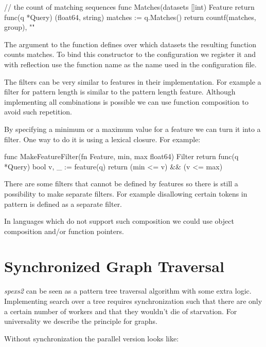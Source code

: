 \begin{file}
// the count of matching sequences
func Matches(datasets []int) Feature {
    return func(q *Query) (float64, string) {
        matches := q.Matches()
        return countf(matches, group), ""
    }
}    
\end{file}

The argument to the function defines over which datasets the resulting function counts matches. To bind this constructor to the configuration we register it and with reflection use the function name as the name used in the configuration file.

The filters can be very similar to features in their implementation. For example a filter for pattern length is similar to the pattern length feature. Although implementing all combinations is possible we can use function composition to avoid such repetition.

By specifying a minimum or a maximum value for a feature we can turn it into a filter. One way to do it is using a lexical closure. For example:

\begin{file}
func MakeFeatureFilter(fn Feature, min, max float64) Filter {
    return func(q *Query) bool {
        v, _ := feature(q)
        return (min <= v) && (v <= max)
    }
}
\end{file}

There are some filters that cannot be defined by features so there is still a possibility to make separate filters. For example disallowing certain tokens in pattern is defined as a separate filter.

In languages which do not support such composition we could use object composition and/or function pointers.

\section{Synchronized Graph Traversal}

\emph{spexs2} can be seen as a pattern tree traversal algorithm with some extra logic. Implementing search over a tree requires synchronization such that there are only a certain number of workers and that they wouldn't die of starvation. For universality we describe the principle for graphs.

Without synchronization the parallel version looks like:

